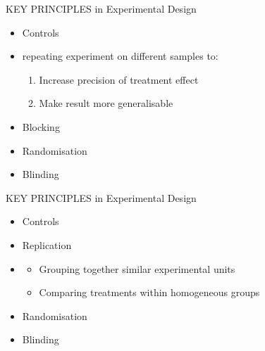 \documentclass{beamer}
\begin{document}
\begin{frame}{KEY PRINCIPLES in Experimental Design}

\begin{alertblock}{}
 \begin{itemize}
  \item Controls
  \item {\color{red}{Replication}} repeating experiment on different samples to: 
    \begin{enumerate}
      \item Increase precision of treatment effect
      \item Make result more generalisable
    \end{enumerate}
  \item Blocking
  \item Randomisation
  \item Blinding
 \end{itemize}

\end{alertblock}

\end{frame}


\begin{frame}{KEY PRINCIPLES in Experimental Design}

\begin{alertblock}{}
 \begin{itemize}
  \item Controls
  \item Replication
  \item {\color{red}{Blocking}}
    \begin{itemize}
     \item Grouping together similar experimental units
     \item Comparing treatments within homogeneous groups
    \end{itemize}
  \item Randomisation
  \item Blinding
 \end{itemize}

\end{alertblock}

\end{frame}
\end{document}
